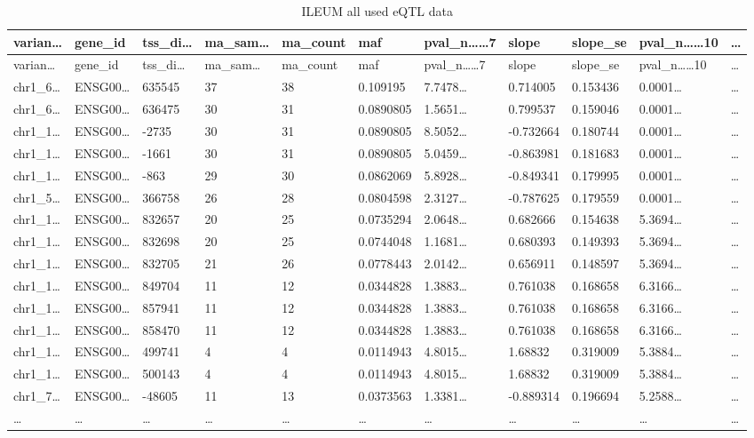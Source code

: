 \documentclass[
]{article}
\begin{document}
\begin{longtable}[]{@{}lllllllllll@{}}
\caption{\label{tab:ILEUM-all-used-eQTL-data}ILEUM all used eQTL data}\tabularnewline
\toprule
varian\ldots{} & gene\_id & tss\_di\ldots{} & ma\_sam\ldots{} & ma\_count & maf & pval\_n\ldots\ldots7 & slope & slope\_se & pval\_n\ldots\ldots10 & \ldots{}\tabularnewline
\midrule
\endfirsthead
\toprule
varian\ldots{} & gene\_id & tss\_di\ldots{} & ma\_sam\ldots{} & ma\_count & maf & pval\_n\ldots\ldots7 & slope & slope\_se & pval\_n\ldots\ldots10 & \ldots{}\tabularnewline
\midrule
\endhead
chr1\_6\ldots{} & ENSG00\ldots{} & 635545 & 37 & 38 & 0.109195 & 7.7478\ldots{} & 0.714005 & 0.153436 & 0.0001\ldots{} & \ldots{}\tabularnewline
chr1\_6\ldots{} & ENSG00\ldots{} & 636475 & 30 & 31 & 0.0890805 & 1.5651\ldots{} & 0.799537 & 0.159046 & 0.0001\ldots{} & \ldots{}\tabularnewline
chr1\_1\ldots{} & ENSG00\ldots{} & -2735 & 30 & 31 & 0.0890805 & 8.5052\ldots{} & -0.732664 & 0.180744 & 0.0001\ldots{} & \ldots{}\tabularnewline
chr1\_1\ldots{} & ENSG00\ldots{} & -1661 & 30 & 31 & 0.0890805 & 5.0459\ldots{} & -0.863981 & 0.181683 & 0.0001\ldots{} & \ldots{}\tabularnewline
chr1\_1\ldots{} & ENSG00\ldots{} & -863 & 29 & 30 & 0.0862069 & 5.8928\ldots{} & -0.849341 & 0.179995 & 0.0001\ldots{} & \ldots{}\tabularnewline
chr1\_5\ldots{} & ENSG00\ldots{} & 366758 & 26 & 28 & 0.0804598 & 2.3127\ldots{} & -0.787625 & 0.179559 & 0.0001\ldots{} & \ldots{}\tabularnewline
chr1\_1\ldots{} & ENSG00\ldots{} & 832657 & 20 & 25 & 0.0735294 & 2.0648\ldots{} & 0.682666 & 0.154638 & 5.3694\ldots{} & \ldots{}\tabularnewline
chr1\_1\ldots{} & ENSG00\ldots{} & 832698 & 20 & 25 & 0.0744048 & 1.1681\ldots{} & 0.680393 & 0.149393 & 5.3694\ldots{} & \ldots{}\tabularnewline
chr1\_1\ldots{} & ENSG00\ldots{} & 832705 & 21 & 26 & 0.0778443 & 2.0142\ldots{} & 0.656911 & 0.148597 & 5.3694\ldots{} & \ldots{}\tabularnewline
chr1\_1\ldots{} & ENSG00\ldots{} & 849704 & 11 & 12 & 0.0344828 & 1.3883\ldots{} & 0.761038 & 0.168658 & 6.3166\ldots{} & \ldots{}\tabularnewline
chr1\_1\ldots{} & ENSG00\ldots{} & 857941 & 11 & 12 & 0.0344828 & 1.3883\ldots{} & 0.761038 & 0.168658 & 6.3166\ldots{} & \ldots{}\tabularnewline
chr1\_1\ldots{} & ENSG00\ldots{} & 858470 & 11 & 12 & 0.0344828 & 1.3883\ldots{} & 0.761038 & 0.168658 & 6.3166\ldots{} & \ldots{}\tabularnewline
chr1\_1\ldots{} & ENSG00\ldots{} & 499741 & 4 & 4 & 0.0114943 & 4.8015\ldots{} & 1.68832 & 0.319009 & 5.3884\ldots{} & \ldots{}\tabularnewline
chr1\_1\ldots{} & ENSG00\ldots{} & 500143 & 4 & 4 & 0.0114943 & 4.8015\ldots{} & 1.68832 & 0.319009 & 5.3884\ldots{} & \ldots{}\tabularnewline
chr1\_7\ldots{} & ENSG00\ldots{} & -48605 & 11 & 13 & 0.0373563 & 1.3381\ldots{} & -0.889314 & 0.196694 & 5.2588\ldots{} & \ldots{}\tabularnewline
\ldots{} & \ldots{} & \ldots{} & \ldots{} & \ldots{} & \ldots{} & \ldots{} & \ldots{} & \ldots{} & \ldots{} & \ldots{}\tabularnewline
\bottomrule
\end{longtable}
\end{document}
